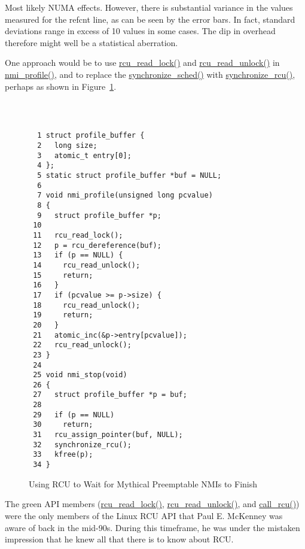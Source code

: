 
Most likely NUMA effects.
However, there is substantial variance in the values measured for the
refcnt line, as can be seen by the error bars.
In fact, standard deviations range in excess of 10%
values in some cases.
The dip in overhead therefore might well be a statistical aberration.


One approach would be to use
\url{rcu_read_lock()} and \url{rcu_read_unlock()}
in \url{nmi_profile()}, and to replace the
\url{synchronize_sched()} with \url{synchronize_rcu()},
perhaps as shown in
Figure~\ref{fig:defer:Using RCU to Wait for Mythical Preemptable NMIs to Finish}.
\\ ~ \\
\begin{figure}[tbp]
{ \tt \scriptsize
\begin{verbatim}
  1 struct profile_buffer {
  2   long size;
  3   atomic_t entry[0];
  4 };
  5 static struct profile_buffer *buf = NULL;
  6 
  7 void nmi_profile(unsigned long pcvalue)
  8 {
  9   struct profile_buffer *p;
 10 
 11   rcu_read_lock();
 12   p = rcu_dereference(buf);
 13   if (p == NULL) {
 14     rcu_read_unlock();
 15     return;
 16   }
 17   if (pcvalue >= p->size) {
 18     rcu_read_unlock();
 19     return;
 20   }
 21   atomic_inc(&p->entry[pcvalue]);
 22   rcu_read_unlock();
 23 }
 24 
 25 void nmi_stop(void)
 26 {
 27   struct profile_buffer *p = buf;
 28 
 29   if (p == NULL)
 30     return;
 31   rcu_assign_pointer(buf, NULL);
 32   synchronize_rcu();
 33   kfree(p);
 34 }
\end{verbatim}
}
\caption{Using RCU to Wait for Mythical Preemptable NMIs to Finish}
\label{fig:defer:Using RCU to Wait for Mythical Preemptable NMIs to Finish}
\end{figure}



The green API members (\url{rcu_read_lock()},
\url{rcu_read_unlock()}, and \url{call_rcu()}) were the
only members of the Linux RCU API that Paul E. McKenney was aware of back
in the mid-90s.
During this timeframe, he was under the mistaken impression that
he knew all that there is to know about RCU.

